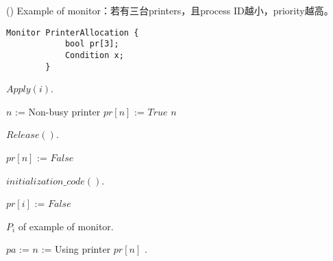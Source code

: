\begin{theorem}{()} Example of monitor：若有三台printers，且process ID越小，priority越高。
    \begin{lstlisting}[caption={Data structure of example of monitor}, captionpos=b, mathescape=true]
        Monitor PrinterAllocation {
            bool pr[3];
            Condition x;
        } 
    \end{lstlisting}
    \begin{algorithm}[H]
        \caption{$Apply(i)$.}
        \begin{algorithmic}[1]
                    \State {}
                \Else
                    \State $n$ := Non-busy printer
                    \State $pr[n]$ := $True$
                    \State \Return $n$
                \EndIf
            \EndFunction
        \end{algorithmic}
    \end{algorithm}
    \begin{algorithm}[H]
        \caption{$Release()$.}
        \begin{algorithmic}[1]
                \State $pr[n]$ := $False$
                \State {}
            \EndFunction
        \end{algorithmic}
    \end{algorithm}
    \begin{algorithm}[H]
        \caption{$initialization\_code()$.}
        \begin{algorithmic}[1]
                    \State $pr[i]$ := $False$
                \EndFor
            \EndFunction
        \end{algorithmic}
    \end{algorithm}
    \begin{algorithm}[H]
        \caption{$P_i$ of example of monitor.}
        \begin{algorithmic}[1]
                \State $pa$ :=   
                \State $n$ := 
                \State Using printer $pr[n]$ .
                \State {}
            \EndFunction
        \end{algorithmic}
    \end{algorithm}
\end{theorem}

